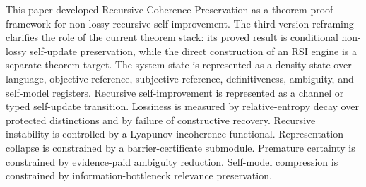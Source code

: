 \documentclass[11pt]{article}
\newcommand{\1}{\mathbf{1}}
\begin{document}
This paper developed Recursive Coherence Preservation as a theorem-proof framework for non-lossy recursive self-improvement. The third-version reframing clarifies the role of the current theorem stack: its proved result is conditional non-lossy self-update preservation, while the direct construction of an RSI engine is a separate theorem target. The system state is represented as a density state over language, objective reference, subjective reference, definitiveness, ambiguity, and self-model registers. Recursive self-improvement is represented as a channel or typed self-update transition. Lossiness is measured by relative-entropy decay over protected distinctions and by failure of constructive recovery. Recursive instability is controlled by a Lyapunov incoherence functional. Representation collapse is constrained by a barrier-certificate submodule. Premature certainty is constrained by evidence-paid ambiguity reduction. Self-model compression is constrained by information-bottleneck relevance preservation.
\end{document}
